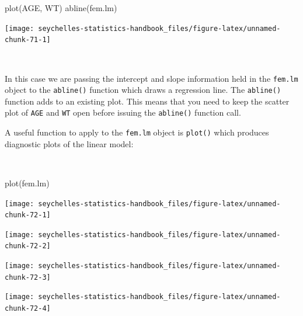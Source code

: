 \documentclass[
  12pt,
]{book}
\newenvironment{Shaded}{\begin{snugshade}}{\end{snugshade}}
\newcommand{\FunctionTok}[1]{\textcolor[rgb]{0.00,0.00,0.00}{#1}}
\newcommand{\NormalTok}[1]{#1}
\begin{document}
\newpage

\begin{Shaded}
\begin{Highlighting}[]
\FunctionTok{plot}\NormalTok{(AGE, WT)}
\FunctionTok{abline}\NormalTok{(fem.lm)}
\end{Highlighting}
\end{Shaded}

\begin{center}\texttt{[image: seychelles-statistics-handbook\_files/figure-latex/unnamed-chunk-71-1]} \end{center}

~

In this case we are passing the intercept and slope information held in the \texttt{fem.lm} object to the \texttt{abline()} function which draws a regression line. The \texttt{abline()} function adds to an existing plot. This means that you need to keep the scatter plot of \texttt{AGE} and \texttt{WT} open before issuing the \texttt{abline()} function call.

\newpage

A useful function to apply to the \texttt{fem.lm} object is \texttt{plot()} which produces diagnostic plots of the linear model:

~

\begin{Shaded}
\begin{Highlighting}[]
\FunctionTok{plot}\NormalTok{(fem.lm)}
\end{Highlighting}
\end{Shaded}

\begin{center}\texttt{[image: seychelles-statistics-handbook\_files/figure-latex/unnamed-chunk-72-1]} \end{center}

\begin{center}\texttt{[image: seychelles-statistics-handbook\_files/figure-latex/unnamed-chunk-72-2]} \end{center}

\begin{center}\texttt{[image: seychelles-statistics-handbook\_files/figure-latex/unnamed-chunk-72-3]} \end{center}

\begin{center}\texttt{[image: seychelles-statistics-handbook\_files/figure-latex/unnamed-chunk-72-4]} \end{center}

\newpage
\end{document}
